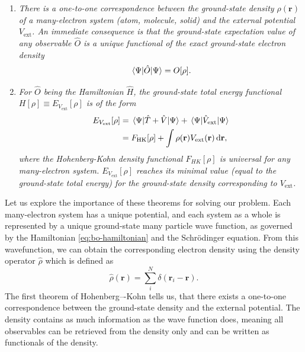 \begin{enumerate}
  \item \textit{There is a one-to-one correspondence between the ground-state
  density $\rho(\mathbf{r})$ of a many-electron system (atom, molecule, solid)
  and the external potential $V_\mathrm{ext}$. An immediate consequence is
  that the ground-state expectation value of any observable $\hat O$ is a
  unique functional of the exact ground-state electron density}
  \begin{equation}
    \mel{\Psi}{\hat O}{\Psi} = O[\rho].
  \end{equation}

  \item \textit{For $\hat O$ being the Hamiltonian $\hat H$, the ground-state
  total energy functional $H[\rho] \equiv E_{V_\mathrm{ext}}[\rho]$ is of the
  form}
  \begin{equation}
  \begin{alignedat}{2}
    E_{V_\mathrm{ext}}[\rho]
    &= \mel{\Psi}{\hat T + \hat V}{\Psi}
    + \mel{\Psi}{\hat V_\mathrm{ext}}{\Psi} \\
    &= F_\mathrm{HK}[\rho] +
    \int \rho(\mathbf{r}) V_\mathrm{ext}(\mathbf{r}) \, \mathrm{d}\mathbf{r},
    \label{eq:hk-2}
  \end{alignedat}
  \end{equation}
  \textit{where the Hohenberg-Kohn density functional $F_{HK}[\rho]$ is
  universal for any many-electron system. $E_{V_\mathrm{ext}}[\rho]$ reaches its
  minimal value (equal to the ground-state total energy) for the ground-state
  density corresponding to $V_\mathrm{ext}$.}
\end{enumerate}

Let us explore the importance of these theorems for solving our problem. Each
many-electron system has a unique potential, and each system as a whole is
represented by a unique ground-state many particle wave function, as governed
by the Hamiltonian \eqref{eq:bo-hamiltonian} and the Schrödinger equation.
From this wavefunction, we can obtain the corresponding electron density using
the density operator $\hat \rho$ which is defined as
\begin{equation}
  \hat \rho(\mathbf{r}) = \sum_i^N \delta(\mathbf{r}_i - \mathbf{r}).
\end{equation}
The first theorem of Hohenberg–-Kohn tells us, that there exists a one-to-one
correspondence between the ground-state density and the external potential.
The density contains as much information as the wave function does, meaning
all observables can be retrieved from the density only and can be written as
functionals of the density.

